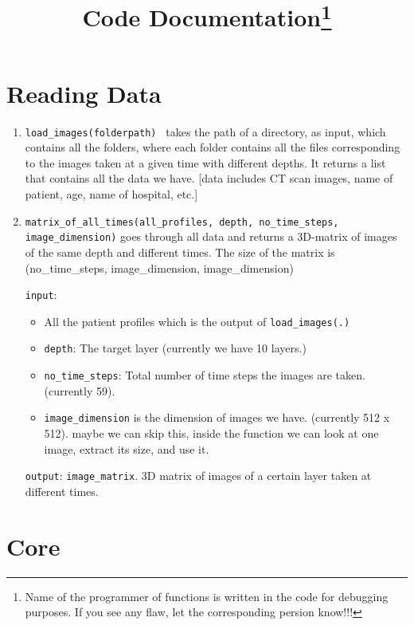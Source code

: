 \documentclass[12pt, letterpaper]{article}
\def\code#1{\texttt{#1}}
\begin{document}
\raggedright

\title{Code Documentation\footnote{Name of the programmer of functions is written in the code for debugging purposes. If you see any flaw, let the corresponding persion know!!!}}
\author{}
\date{}

\maketitle

\section{Reading Data}

\begin{enumerate}
\item \code{load\_images(folderpath) } takes the path of a directory, as input, which contains all the folders, where each folder contains all the files corresponding to the images taken at a given time with different depths. 
It returns a list that contains all the data we have. [data includes CT scan images, name of patient, age, name of hospital, etc.]

\item \code{matrix\_of\_all\_times(all\_profiles, depth, no\_time\_steps, image\_dimension)} 
goes through all data and returns a 3D-matrix of images of the same depth and different times.
The size of the matrix is 
{\small{(no\_time\_steps, image\_dimension, image\_dimension)}}

\code{input}: 
\begin{itemize}
\item All the patient profiles which is the output of \code{load\_images(.)}
\item \code{depth}: The target layer (currently we have 10 layers.)
\item \code{no\_time\_steps}: Total number of time steps the images are taken. (currently 59).
\item \code{image\_dimension} is the dimension of images we have. (currently 512 x 512).
maybe we can skip this, inside the function we can look at one image, extract its size, and use it.
\end{itemize}

\code{output}: \code{image\_matrix}. 3D matrix of images of a certain layer taken at different times.
\end{enumerate}

\section{Core}
\end{document}
